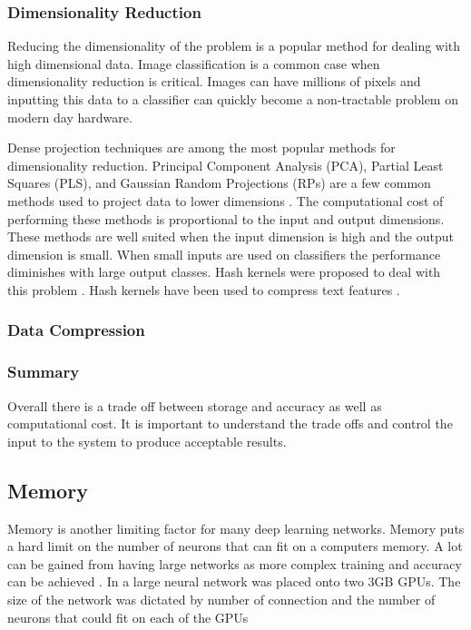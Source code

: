 \documentclass[conference]{IEEEtran}
\begin{document}
\subsubsection{Dimensionality Reduction}
Reducing the dimensionality of the problem is a popular method for dealing with high dimensional data. Image classification is a common case when dimensionality reduction is critical. Images can have millions of pixels and inputting this data to a classifier can quickly become a non-tractable problem on modern day hardware.

Dense projection techniques are among the most popular methods for dimensionality reduction. Principal Component Analysis (PCA), Partial Least Squares (PLS), and Gaussian Random Projections (RPs) are a few common methods used to project data to lower dimensions \cite{sanchez2011high}. The computational cost of performing these methods is proportional to the input and output dimensions. These methods are well suited when the input dimension is high and the output dimension is small. When small inputs are used on classifiers the performance diminishes with large output classes. Hash kernels were proposed to deal with this problem \cite{shi2009hash,weinberger2009feature}. Hash kernels have been used to compress text features \cite{shi2009hash,weinberger2009feature}.

\subsubsection{Data Compression}

\subsubsection{Summary}
Overall there is a trade off between storage and accuracy as well as computational cost. It is important to understand the trade offs and control the input to the system to produce acceptable results.

\subsection{Memory}
Memory is another limiting factor for many deep learning networks. Memory puts a hard limit on the number of neurons that can fit on a computers memory. A lot can be gained from having large networks as more complex training and accuracy can be achieved \cite{krizhevsky2012imagenet}. In \cite{krizhevsky2012imagenet} a large neural network was placed onto two 3GB GPUs. The size of the network was dictated by number of connection and the number of neurons that could fit on each of the GPUs
\end{document}
